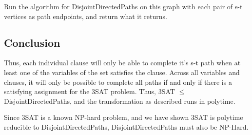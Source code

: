 \documentclass[a4paper]{article}
\begin{document}
Run the algorithm for DisjointDirectedPaths on this graph with each pair of s-t vertices as path endpoints, and return what it returns.

\subsection{Conclusion}

Thus, each individual clause will only be able to complete it's s-t path when at least one of the variables of the set satisfies the clause. Across all variables and clauses, it will only be possible to complete all paths if and only if there is a satisfying assignment for the 3SAT problem. Thus, 3SAT $\leq$ DisjointDirectedPaths, and the transformation as described runs in polytime.

Since 3SAT is a known NP-hard problem, and we have shown 3SAT is polytime reducible to DisjointDirectedPaths, DisjointDirectedPaths must also be NP-Hard.
\end{document}
